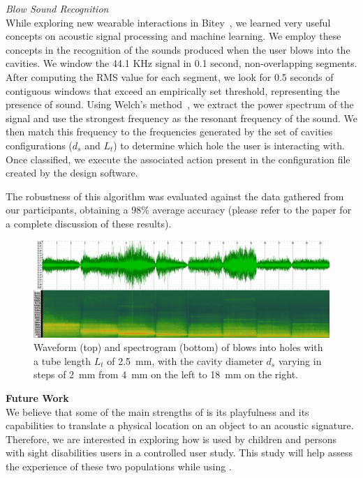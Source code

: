          \textit{Blow Sound Recognition}\\
            While exploring new wearable interactions in
            Bitey~\cite{Ashbrook:2016ek}, we learned very useful concepts on
            acoustic signal processing and machine learning. We employ these
            concepts in the recognition of the sounds produced when the user
            blows into the \bh cavities. We window the 44.1 KHz signal in 0.1
            second, non-overlapping segments. After computing the RMS value for
            each segment, we look for 0.5 seconds of contiguous windows that
            exceed an empirically set threshold, representing the presence of
            sound. Using Welch's method~\cite{Welch:1967jw}, we extract the
            power spectrum of the signal and use the strongest frequency as the
            resonant frequency of the sound. We then match this frequency to
            the frequencies generated by the set of cavities configurations
            ($d_s$ and $L_t$) to determine which hole the user is interacting
            with. Once classified, we execute the associated action present in
            the configuration file created by the design software.
                       
            The robustness of this algorithm was evaluated against the data
            gathered from our participants, obtaining a 98\% average accuracy
            (please refer to the paper for a complete discussion of these
            results).
            
        \begin{figure}[t]
          \centering
            \includegraphics[width=\textwidth]{figures/spectrogram.png}
            \caption{Waveform (top) and spectrogram (bottom) of blows into
            holes with a tube length $L_t$ of 2.5~mm, with the cavity diameter
            $d_s$ varying in steps of 2~mm from 4~mm on the left to 18~mm on
            the right.}
            \label{fig:spectrogram}
        \end{figure}

      \textbf{Future Work}\\        
        We believe that some of the main strengths of \bh is its
        playfulness and its capabilities to translate a physical location on an object to an
        acoustic signature. Therefore, we are interested in exploring how
        \bh is used by children and persons with sight disabilities users in a controlled
        user study. This study will help assess the experience of these two
        populations while using \bh.
        
